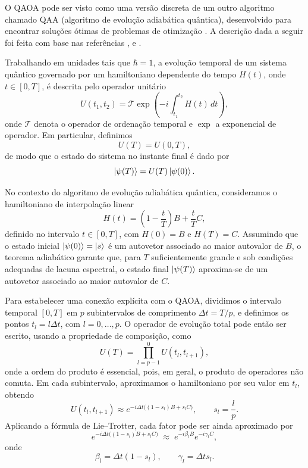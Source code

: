 O QAOA pode ser visto como uma versão discreta de um outro algoritmo chamado QAA (algoritmo de evolução adiabática quântica), desenvolvido para encontrar soluções ótimas de problemas de otimização \cite{Farhi2002QuantumAdiabatic}. A descrição dada a seguir foi feita com base nas referências \cite{Olivares2021QuantumComputing}, \cite{MIT8_321F17_Lec8} e \cite{Kottmann2024TimeOrdered}.

Trabalhando em unidades tais que $\hbar = 1$, a evolução temporal de um sistema quântico governado por um hamiltoniano dependente do tempo $H(t)$, onde $t\in [0, T]$, é descrita pelo operador unitário
\begin{equation}
U(t_1,t_2) = \mathcal{T}\exp\!\left(-i\int_{t_1}^{t_2} H(t)\,dt\right),
\end{equation}
onde $\mathcal{T}$ denota o operador de ordenação temporal e $\exp$ a exponencial de operador. Em particular,
definimos
\begin{equation}
U(T) = U(0,T),
\end{equation}
de modo que o estado do sistema no instante final é dado por
\begin{equation}
\ket{\psi(T)} = U(T)\ket{\psi(0)}.
\end{equation}

No contexto do algoritmo de evolução adiabática quântica, consideramos o
hamiltoniano de interpolação linear
\begin{equation}
H(t) = \left(1-\frac{t}{T}\right)B + \frac{t}{T}C,
\end{equation}
definido no intervalo $t\in[0,T]$, com $H(0)=B$ e $H(T)=C$. Assumindo que o estado
inicial $\ket{\psi(0)}=\ket{s}$ é um autovetor associado ao maior autovalor de $B$,
o teorema adiabático garante que, para $T$ suficientemente grande e sob condições
adequadas de lacuna espectral, o estado final $\ket{\psi(T)}$ aproxima-se de um
autovetor associado ao maior autovalor de $C$.

Para estabelecer uma conexão explícita com o QAOA, dividimos o intervalo temporal
$[0,T]$ em $p$ subintervalos de comprimento $\Delta t = T/p$, e definimos os pontos
$t_l = l\Delta t$, com $l=0,\dots,p$. O operador de evolução total pode então ser
escrito, usando a propriedade de composição, como
\begin{equation}
U(T) = \prod_{l=p-1}^{0} U(t_l,t_{l+1}),
\end{equation}
onde a ordem do produto é essencial, pois, em geral, o produto de operadores não comuta. Em cada subintervalo, aproximamos o hamiltoniano por seu valor em $t_l$, obtendo
\begin{equation}
U(t_l,t_{l+1}) \approx e^{-i\Delta t \big((1-s_l)B+s_l C\big)},
\qquad s_l = \frac{l}{p}.
\end{equation}
Aplicando a fórmula de Lie--Trotter, cada fator pode ser ainda
aproximado por
\begin{equation}
    e^{-i\Delta t\big((1-s_l)B+s_l C\big)} \;\approx\; e^{-i\beta_l B}e^{-i\gamma_l C},
\end{equation}
onde
\begin{equation}
\beta_l = \Delta t(1-s_l), \qquad \gamma_l = \Delta t s_l.
\end{equation}


